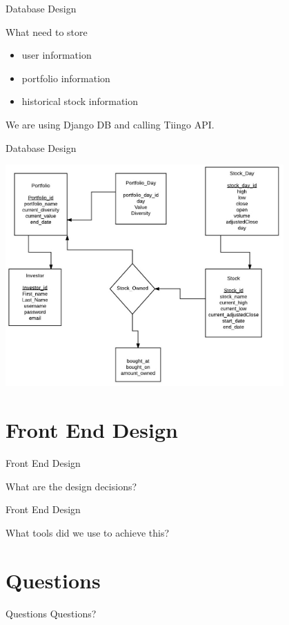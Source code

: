 \documentclass{beamer}
\begin{document}
\begin{frame}{Database Design}

What need to store
\begin{itemize}
	\item user information
	\item portfolio information
	\item historical stock information
\end{itemize}

We are using Django DB and calling Tiingo API.

\end{frame}


\begin{frame}{Database Design}

\centering
\includegraphics[width=0.8\textwidth]{db_diagram}

\end{frame}

\section{Front End Design}

\begin{frame}{Front End Design}

What are the design decisions?

\end{frame}

\begin{frame}{Front End Design}

What tools did we use to achieve this?

\end{frame}

\section*{Questions}
\begin{frame}{Questions}
\centering
Questions?
\end{frame}
\end{document}
